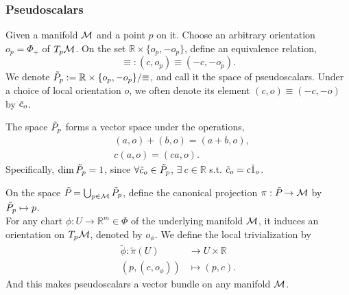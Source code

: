 \documentclass[../main.tex]{subfiles}
\begin{document}
    \subsubsection{Pseudoscalars}
    \begin{definition}\label{def:pseudoscalar-space}
        Given a manifold \(\manifold[M]\) and a point \(p\) on it.
        Choose an arbitrary orientation \(o_p=\Phi_+\) of \(T_p\manifold[M]\). On the 
        set \(\mathbb{R}\times \{o_p, -o_p\}\), define an equivalence relation,
        \[
        {\equiv} : (c, o_p) \equiv (-c, -o_p).
        \]
        We denote \(\pseudoscalar[p] := \mathbb{R}\times \{o_p, -o_p\} / {\equiv}\), 
        and call it the space of pseudoscalars. Under a choice of local orientation 
        \(o\), we often denote its element \((c, o) \equiv (-c, -o)\) by 
        \(\pseudo{c}_o\).
    \end{definition}
    \newpage
    \begin{theorem}\label{thm:pseudoscalar-vector-space}
        The space \(\pseudoscalar[p]\) forms a vector space under the operations,
        \[
        \begin{aligned}
            &(a, o) + (b, o) = (a+b, o), \\
            &c(a, o) = (ca, o).
        \end{aligned}
        \]
        Specifically, \(\dim \pseudoscalar[p]=1\), since \(\forall \pseudo{c}_o \in 
        \pseudoscalar[p]\), \(\exists~c \in \mathbb{R}\) s.t. 
        \(\pseudo{c}_o = c\pseudo{1}_o\).
    \end{theorem}
    \begin{theorem}\label{thm:pseudoscalar-vector-bundle}
        On the space \(\pseudoscalar = \bigcup_{p \in \manifold[M]}^{}
        \pseudoscalar[p]\), define the canonical projection \(\pi : \pseudoscalar \to 
        \manifold[M]\) by \(\pseudoscalar[p] \mapsto p\).\\
        For any chart \(\phi : U \to \mathbb{R}^m \in \Phi\) of the underlying 
        manifold \(\manifold[M]\), it induces an orientation on \(T_p\manifold[M]\), 
        denoted by \(o_\phi\). We define the local trivialization by 
        \[
        \begin{aligned}
            \tilde{\phi} : \tilde{\pi}(U) &\to U \times \mathbb{R} \\
            (p, (c, o_\phi)) &\mapsto (p, c).
        \end{aligned}
        \]
        And this makes pseudoscalars a vector bundle on any manifold \(\manifold[M]\).
    \end{theorem}
\end{document}
